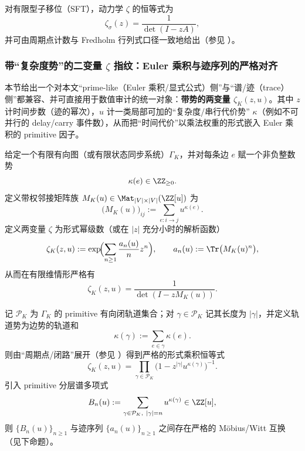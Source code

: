 对有限型子移位（SFT），动力学 $\zeta$ 的恒等式为
\[
\zeta_\sigma(z)=\frac{1}{\det(I-zA)},
\]
并可由周期点计数与 Fredholm 行列式口径一致地给出（参见 \cite{LindMarcus1995,Ruelle1976ZetaExpanding,Ruelle1978Thermodynamic,ParryPollicott1990Zeta}）。

\subsubsection{带“复杂度势”的二变量 \texorpdfstring{$\zeta$}{zeta} 指纹：Euler 乘积与迹序列的严格对齐}\label{subsec:zeta-two-variable-kappa}

本节给出一个对本文“prime-like（Euler 乘积/显式公式）侧”与“谱/迹（trace）侧”都兼容、并可直接用于数值审计的统一对象：\textbf{带势的两变量 \(\zeta_K(z,u)\)}。其中 \(z\) 计时间步数（迹的幂次），\(u\) 计一类局部可加的“复杂度/串行代价势” \(\kappa\)（例如不可并行的 delay/carry 事件数），从而把“时间代价”以乘法权重的形式嵌入 Euler 乘积的 primitive 因子。

\begin{definition}\label{def:zetaK-zu}
给定一个有限有向图（或有限状态同步系统）\(\Gamma_K\)，并对每条边 \(e\) 赋一个非负整数势
\[
\kappa(e)\in\ZZ_{\ge 0}.
\]
定义带权邻接矩阵族 \(M_K(u)\in \Mat_{|V|\times |V|}(\ZZ[u])\) 为
\[
\bigl(M_K(u)\bigr)_{ij}:=\sum_{e:i\to j} u^{\kappa(e)}.
\]
定义两变量 \(\zeta\) 为形式幂级数（或在 \(|z|\) 充分小时的解析函数）
\begin{equation}\label{eq:zetaK-trace-exp}
\zeta_K(z,u)
:=\exp\!\Bigl(\sum_{n\ge 1}\frac{a_n(u)}{n}z^n\Bigr),
\qquad
a_n(u):=\Tr\bigl(M_K(u)^n\bigr),
\end{equation}
从而在有限维情形严格有
\begin{equation}\label{eq:zetaK-det}
\zeta_K(z,u)=\frac{1}{\det(I-zM_K(u))}.
\end{equation}
\end{definition}

\begin{remark}\label{rem:zetaK-euler-product}
记 \(\mathcal{P}_K\) 为 \(\Gamma_K\) 的 primitive 有向闭轨道集合；对 \(\gamma\in\mathcal{P}_K\) 记其长度为 \(|\gamma|\)，并定义轨道势为边势的轨道和
\[
\kappa(\gamma):=\sum_{e\in\gamma}\kappa(e).
\]
则由“周期点/闭路”展开（参见 \cite{ParryPollicott1990Zeta,LindMarcus1995}）得到严格的形式乘积恒等式
\begin{equation}\label{eq:zetaK-euler}
\zeta_K(z,u)=\prod_{\gamma\in\mathcal{P}_K}\bigl(1-z^{|\gamma|}u^{\kappa(\gamma)}\bigr)^{-1}.
\end{equation}
引入 primitive 分层谱多项式
\begin{equation}\label{eq:zetaK-Bn}
B_n(u):=\sum_{\gamma\in\mathcal{P}_K,\ |\gamma|=n} u^{\kappa(\gamma)}\in\ZZ[u],
\end{equation}
则 \(\{B_n(u)\}_{n\ge 1}\) 与迹序列 \(\{a_n(u)\}_{n\ge 1}\) 之间存在严格的 Möbius/Witt 互换（见下命题）。
\end{remark}

